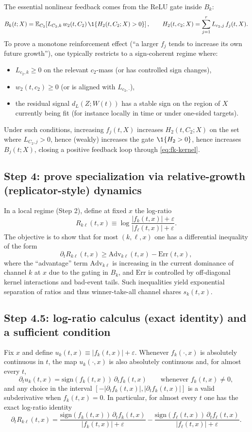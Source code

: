 The essential nonlinear feedback comes from the ReLU gate inside $B_k$:
\[
B_k(t;X)=\E_{C_2}\!\left[L_{C_2,k}\,w_2(t,C_2)\,\1\{H_2(t,C_2;X)>0\}\right],\qquad
H_2(t,c_2;X)=\sum_{j=1}^r L_{c_2,j}\,f_j(t,X).
\]
To prove a monotone reinforcement effect (``a larger $f_j$ tends to increase its own future growth''), one typically restricts to a sign-coherent regime where:
\begin{itemize}
\item $L_{c_2,k}\ge 0$ on the relevant $c_2$-mass (or has controlled sign changes),
\item $w_2(t,c_2)\ge 0$ (or is aligned with $L_{c_2,\cdot}$),
\item the residual signal $d_L(Z;W(t))$ has a stable sign on the region of $X$ currently being fit (for instance locally in time or under one-sided targets).
\end{itemize}
Under such conditions, increasing $f_j(t,X)$ increases $H_2(t,C_2;X)$ on the set where $L_{C_2,j}>0$, hence (weakly) increases the gate $\1\{H_2>0\}$, hence increases $B_j(t;X)$, closing a positive feedback loop through \eqref{eq:fk-kernel}.

\subsection{Step 4: prove specialization via relative-growth (replicator-style) dynamics}

In a local regime (Step 2), define at fixed $x$ the log-ratio
\[
R_{k\ell}(t,x)\equiv \log\frac{|f_k(t,x)|+\varepsilon}{|f_\ell(t,x)|+\varepsilon}.
\]
The objective is to show that for most $(k,\ell,x)$ one has a differential inequality of the form
\[
\partial_t R_{k\ell}(t,x)\ge \mathrm{Adv}_{k\ell}(t,x)-\mathrm{Err}(t,x),
\]
where the ``advantage'' term $\mathrm{Adv}_{k\ell}$ is increasing in the current dominance of channel $k$ at $x$ due to the gating in $B_k$, and $\mathrm{Err}$ is controlled by off-diagonal kernel interactions and bad-event tails.
Such inequalities yield exponential separation of ratios and thus winner-take-all channel shares $s_k(t,x)$.

\subsection{Step 4.5: log-ratio calculus (exact identity) and a sufficient condition}\label{subsec:step45}

Fix $x$ and define $u_k(t,x)\equiv |f_k(t,x)|+\varepsilon$.
Whenever $f_k(\cdot,x)$ is absolutely continuous in $t$, the map $u_k(\cdot,x)$ is also absolutely continuous and, for almost every $t$,
\[
\partial_t u_k(t,x)=\mathrm{sign}(f_k(t,x))\,\partial_t f_k(t,x)\qquad\text{whenever }f_k(t,x)\neq 0,
\]
and any choice in the interval $[-|\partial_t f_k(t,x)|,|\partial_t f_k(t,x)|]$ is a valid subderivative when $f_k(t,x)=0$.
In particular, for almost every $t$ one has the exact log-ratio identity
\begin{equation}\label{eq:logratio-identity}
\partial_t R_{k\ell}(t,x)=\frac{\mathrm{sign}(f_k(t,x))\,\partial_t f_k(t,x)}{|f_k(t,x)|+\varepsilon}
-\frac{\mathrm{sign}(f_\ell(t,x))\,\partial_t f_\ell(t,x)}{|f_\ell(t,x)|+\varepsilon}.
\end{equation}

